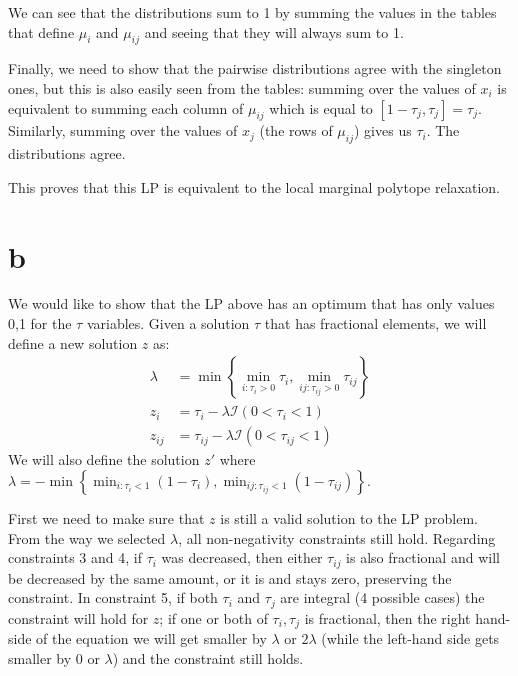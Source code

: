 \documentclass[11pt]{article}
\begin{document}
We can see that the distributions sum to 1 by summing the values in the tables that define $\mu_i$ and $\mu_{ij}$ and seeing that they will always sum to 1.

Finally, we need to show that the pairwise distributions agree with the singleton ones,
but this is also easily seen from the tables:
summing over the values of $x_i$ is equivalent to summing each column of $\mu_{ij}$ which is equal to $[1 - \tau_j, \tau_j] = \tau_j$. Similarly, summing over the values of $x_j$ (the rows of $\mu_{ij}$) gives us $\tau_i$. The distributions agree.

This proves that this LP is equivalent to the local marginal polytope relaxation.

\section*{b}

We would like to show that the LP above has an optimum that has only values 0,1 for the $\tau$ variables.
Given a solution $\tau$ that has fractional elements, we will define a new solution $z$ as:
\begin{align*}
	\lambda &= \min\left\{\min_{i:\tau_i>0} \tau_i , \min_{ij:\tau_{ij}>0} \tau_{ij} \right\} \\
	z_{i } &= \tau_{i } - \lambda \mathcal{I}(0 < \tau_{i } < 1) \\
	z_{ij} &= \tau_{ij} - \lambda \mathcal{I}(0 < \tau_{ij} < 1)
\end{align*}
We will also define the solution $z'$ where
$\lambda = -\min\left\{\min_{i:\tau_i<1} (1-\tau_i) , \min_{ij:\tau_{ij}<1} (1-\tau_{ij}) \right\}$.

First we need to make sure that $z$ is still a valid solution to the LP problem.
From the way we selected $\lambda$, all non-negativity constraints still hold.
Regarding constraints 3 and 4, if $\tau_i$ was decreased,
then either $\tau_{ij}$ is also fractional and will be decreased by the same amount,
or it is and stays zero, preserving the constraint.
In constraint 5, if both $\tau_i$ and $\tau_j$ are integral (4 possible cases)
the constraint will hold for $z$; if one or both of $\tau_i,\tau_j$ is fractional,
then the right hand-side of the equation we will get smaller by $\lambda$ or $2\lambda$ (while the left-hand side gets smaller by 0 or $\lambda$) and the constraint still holds.
\end{document}
